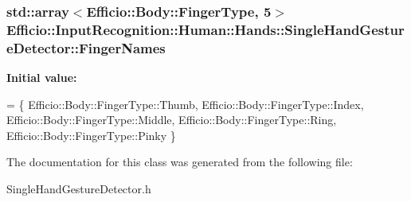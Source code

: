 \subsubsection[{\texorpdfstring{Finger\+Names}{FingerNames}}]{\setlength{\rightskip}{0pt plus 5cm}std\+::array$<$Efficio\+::\+Body\+::\+Finger\+Type, 5$>$ Efficio\+::\+Input\+Recognition\+::\+Human\+::\+Hands\+::\+Single\+Hand\+Gesture\+Detector\+::\+Finger\+Names\hspace{0.3cm}{\ttfamily [protected]}}\hypertarget{class_efficio_1_1_input_recognition_1_1_human_1_1_hands_1_1_single_hand_gesture_detector_a500f4eb83fd6ba19b35622f4c510cb4a}{}\label{class_efficio_1_1_input_recognition_1_1_human_1_1_hands_1_1_single_hand_gesture_detector_a500f4eb83fd6ba19b35622f4c510cb4a}
{\bfseries Initial value\+:}
\begin{DoxyCode}
= 
                    \{ 
                        Efficio::Body::FingerType::Thumb,
                        Efficio::Body::FingerType::Index,
                        Efficio::Body::FingerType::Middle,
                        Efficio::Body::FingerType::Ring,
                        Efficio::Body::FingerType::Pinky
                    \}
\end{DoxyCode}


The documentation for this class was generated from the following file\+:\begin{DoxyCompactItemize}
\item 
Single\+Hand\+Gesture\+Detector.\+h\end{DoxyCompactItemize}
